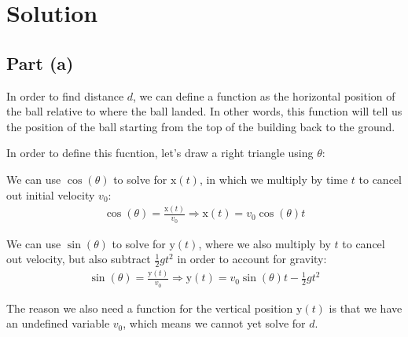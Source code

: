 \documentclass{article}
\newcommand{\x}{\mathrm{x}}
\newcommand{\y}{\mathrm{y}}
\begin{document}
\newpage
\section*{Solution}

\subsection*{Part (a)}
In order to find distance $d$, we can define a function as the
horizontal position of the ball relative to where the ball landed.
In other words, this function will tell us the position of the ball
starting from the top of the building back to the ground. 

In order to define this fucntion, let's draw a right triangle using $\theta$:
\begin{figure}[H]
    \centering
\end{figure}
We can use $\cos(\theta)$ to solve for $\x(t)$, 
in which we multiply by time $t$ to cancel out initial velocity $v_0$:
\begin{align}
    \cos(\theta)  = \frac{\x(t)}{v_0} \Rightarrow \boxed{\x(t) = v_0\cos(\theta)t}
\end{align}

We can use $\sin(\theta)$ to solve for $\y(t)$,
where we also multiply by $t$ to cancel out velocity, 
but also subtract $\frac{1}{2}gt^2$ in order to account 
for gravity:
\begin{align}
    \sin(\theta) = \frac{\y(t)}{v_0} \Rightarrow \boxed{\y(t) = v_0\sin(\theta)t - \frac{1}{2}gt^2}
\end{align}

The reason we also need a function for the vertical position $\y(t)$
is that we have an undefined variable $v_0$, which means we cannot yet 
solve for $d$.
\end{document}
